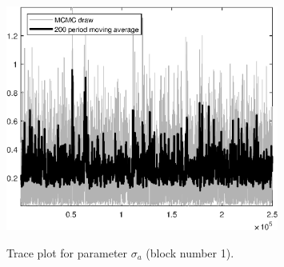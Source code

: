 \begin{figure}[H]
\centering
  \includegraphics[width=0.8\textwidth]{BRS_growth_ext_comovement/graphs/TracePlot_sigma_a_blck_1}\\
    \caption{Trace plot for parameter ${\sigma_a}$ (block number 1).}
\end{figure}
